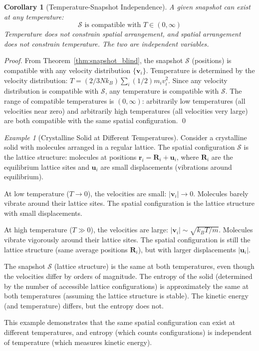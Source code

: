 \documentclass[12pt,a4paper]{article}
\newtheorem{corollary}[theorem]{Corollary}
\theoremstyle{definition}
\theoremstyle{remark}
\newtheorem{example}[theorem]{Example}
\begin{document}
\begin{corollary}[Temperature-Snapshot Independence]
\label{cor:temperature_snapshot}
A given snapshot can exist at any temperature:
\begin{equation}
\mathcal{S} \text{ is compatible with } T \in (0, \infty)
\label{eq:snapshot_temperature}
\end{equation}
Temperature does not constrain spatial arrangement, and spatial arrangement does not constrain temperature. The two are independent variables.
\end{corollary}

\begin{proof}
From Theorem~\ref{thm:snapshot_blind}, the snapshot $\mathcal{S}$ (positions) is compatible with any velocity distribution $\{\mathbf{v}_i\}$. Temperature is determined by the velocity distribution: $T = (2/3N k_B) \sum_i (1/2) m_i v_i^2$. Since any velocity distribution is compatible with $\mathcal{S}$, any temperature is compatible with $\mathcal{S}$. The range of compatible temperatures is $(0, \infty)$: arbitrarily low temperatures (all velocities near zero) and arbitrarily high temperatures (all velocities very large) are both compatible with the same spatial configuration. \qed
\end{proof}

\begin{example}[Crystalline Solid at Different Temperatures]
\label{ex:crystal_temperatures}
Consider a crystalline solid with molecules arranged in a regular lattice. The spatial configuration $\mathcal{S}$ is the lattice structure: molecules at positions $\mathbf{r}_i = \mathbf{R}_i + \mathbf{u}_i$, where $\mathbf{R}_i$ are the equilibrium lattice sites and $\mathbf{u}_i$ are small displacements (vibrations around equilibrium).

At low temperature ($T \to 0$), the velocities are small: $|\mathbf{v}_i| \to 0$. Molecules barely vibrate around their lattice sites. The spatial configuration is the lattice structure with small displacements.

At high temperature ($T \gg 0$), the velocities are large: $|\mathbf{v}_i| \sim \sqrt{k_B T / m}$. Molecules vibrate vigorously around their lattice sites. The spatial configuration is still the lattice structure (same average positions $\mathbf{R}_i$), but with larger displacements $|\mathbf{u}_i|$.

The snapshot $\mathcal{S}$ (lattice structure) is the same at both temperatures, even though the velocities differ by orders of magnitude. The entropy of the solid (determined by the number of accessible lattice configurations) is approximately the same at both temperatures (assuming the lattice structure is stable). The kinetic energy (and temperature) differs, but the entropy does not.

This example demonstrates that the same spatial configuration can exist at different temperatures, and entropy (which counts configurations) is independent of temperature (which measures kinetic energy).
\end{example}
\end{document}
